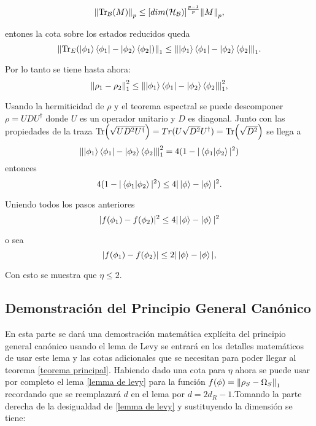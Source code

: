 \begin{equation}
\norm{\Tr_{\mathcal{B}}(M)}_{p} \le [dim(\mathcal{H_{B}})]^{\frac{p-1}{p}} \norm{M}_{p},
\end{equation}

entones la cota sobre los estados reducidos queda 
\begin{equation}
\norm{\Tr_{E}(\ket{\phi_{1}} \bra{\phi_{1}}-\ket{\phi_{2}} \bra{\phi_{2}})}_{1} \le \norm{\ket{\phi_{1}} \bra{\phi_{1}}-\ket{\phi_{2}} \bra{\phi_{2}}}_{1}.
\end{equation}

Por lo tanto se tiene hasta ahora:
\begin{equation}
\norm{\rho_{1}- \rho_{2} }_{1}^2 \le \norm{\ket{\phi_{1}} \bra{\phi_{1}}-\ket{\phi_{2}} \bra{\phi_{2}}}_{1}^{2},
\end{equation}

Usando la hermiticidad de $\rho$ y el teorema espectral se puede descomponer $\rho= UDU^{\dag}$ donde $U$ es un operador unitario y $D$ es diagonal. Junto con las propiedades de la traza $\Tr(\sqrt{UD^2U^{\dag}})= Tr(U\sqrt{D^2}U^{\dag})= \Tr(\sqrt{D^{2}})$ se llega a
\begin{equation}
\norm{\ket{\phi_{1}} \bra{\phi_{1}}-\ket{\phi_{2}} \bra{\phi_{2}}}_{1}^{2} = 4(1-|\bra{\phi_{1}} \ket{\phi_{2}}|^{2})
\end{equation}
entonces
\begin{equation}
 4(1-|\bra{\phi_{1}} \ket{\phi_{2}}|^{2}) \le 4|\ket{\phi}-\ket{\phi}|^2.
\end{equation}

Uniendo todos los pasos anteriores
\begin{equation}
|f(\phi_{1})-f(\phi_{2})|^{2} \le  4|\ket{\phi}-\ket{\phi}|^2
\end{equation}

o sea 
\begin{equation}
|f(\phi_{1})-f(\phi_{2})| \le  2|\ket{\phi}-\ket{\phi}|,
\end{equation}

Con esto se muestra que $\eta \le 2$.\\

\subsection{Demonstración del Principio General Canónico}
En esta parte se dará una demostración matemática explícita del principio general canónico usando el lema de Levy se entrará en los detalles matemáticos de usar este lema y las cotas adicionales que se necesitan para poder llegar al teorema \ref{teorema principal}. Habiendo dado una cota para $\eta$ ahora se puede usar por completo el lema \ref{lemma de levy} para la función $f(\phi)=\norm{\rho_{S} -\Omega_{S}}_{1}$ recordando que se reemplazará $d$ en el lema por $d=2d_{R}-1$.Tomando la parte derecha de la desigualdad de \ref{lemma de levy}  y sustituyendo la dimensión se tiene:

